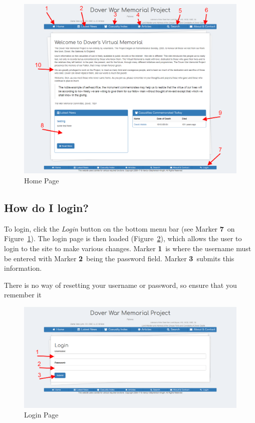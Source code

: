 \documentclass[12pt]{article}
\newcommand{\marker}[1]{Marker \color{red}\textbf{#1}\color{black}}
\begin{document}
\begin{figure}[h]
  \centering
 \includegraphics[width=.9\textwidth]{pics/home.png}
	\caption{Home Page}\label{fig:home}
\end{figure}

\newpage
\FloatBarrier
\subsection{How do I login?}\label{ssec:login}
To login, click the \textit{Login} button on the bottom menu bar (see \marker{7}\ on Figure~\ref{fig:home}). The login page is then loaded (Figure~\ref{fig:login}), which allows the user to login to the site to make various changes. \marker{1}\ is where the username must be entered with \marker{2}\ being the password field. \marker{3}\ submits this information.

\begin{warningBox}
There is no way of resetting your username or password, so ensure that you remember it
\end{warningBox}

\begin{figure}[h]
  \centering
 \includegraphics[width=.9\textwidth]{pics/login.png}
	\caption{Login Page}\label{fig:login}
\end{figure}
\end{document}
